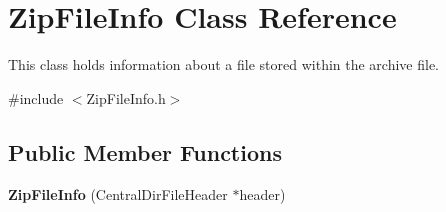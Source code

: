 \hypertarget{class_zip_file_info}{}\section{Zip\+File\+Info Class Reference}
\label{class_zip_file_info}


This class holds information about a file stored within the archive file.  




{\ttfamily \#include $<$Zip\+File\+Info.\+h$>$}

\subsection*{Public Member Functions}
\begin{DoxyCompactItemize}
\item 
{\bfseries Zip\+File\+Info} (Central\+Dir\+File\+Header $\ast$header)\hypertarget{class_zip_file_info_a53eaec8e89f609f959be56f472d4ee6d}{}\label{class_zip_file_info_a53eaec8e89f609f959be56f472d4ee6d}

\end{DoxyCompactItemize}
